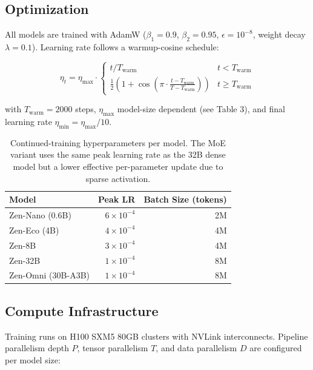 \documentclass[11pt,a4paper]{article}
\begin{document}
\subsection{Optimization}

All models are trained with AdamW ($\beta_1=0.9$, $\beta_2=0.95$, $\epsilon=10^{-8}$,
weight decay $\lambda=0.1$). Learning rate follows a warmup-cosine schedule:

\begin{equation}
\eta_t = \eta_{\max} \cdot \begin{cases} t / T_{\text{warm}} & t < T_{\text{warm}} \\ \frac{1}{2}\left(1 + \cos\left(\pi \cdot \frac{t - T_{\text{warm}}}{T - T_{\text{warm}}}\right)\right) & t \geq T_{\text{warm}} \end{cases}
\end{equation}

with $T_{\text{warm}} = 2000$ steps, $\eta_{\max}$ model-size dependent (see Table 3),
and final learning rate $\eta_{\min} = \eta_{\max}/10$.

\begin{table}[H]
\centering
\begin{tabular}{lrr}
\toprule
\textbf{Model} & \textbf{Peak LR} & \textbf{Batch Size (tokens)} \\
\midrule
Zen-Nano (0.6B) & $6\times10^{-4}$ & 2M \\
Zen-Eco (4B)    & $4\times10^{-4}$ & 4M \\
Zen-8B          & $3\times10^{-4}$ & 4M \\
Zen-32B         & $1\times10^{-4}$ & 8M \\
Zen-Omni (30B-A3B) & $1\times10^{-4}$ & 8M \\
\bottomrule
\end{tabular}
\caption{Continued-training hyperparameters per model. The MoE variant uses the same
peak learning rate as the 32B dense model but a lower effective per-parameter update due
to sparse activation.}
\end{table}

\subsection{Compute Infrastructure}

Training runs on H100 SXM5 80GB clusters with NVLink interconnects. Pipeline
parallelism depth $P$, tensor parallelism $T$, and data parallelism $D$ are
configured per model size:
\end{document}
